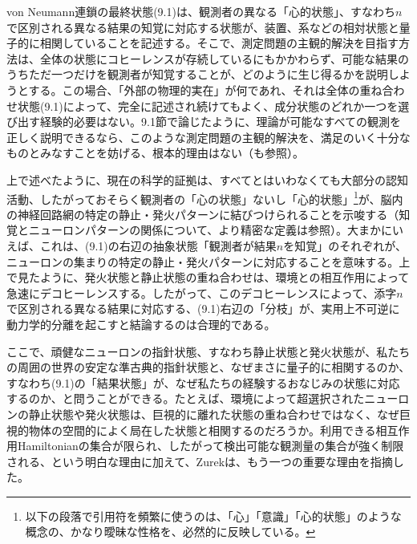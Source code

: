 \hypertarget{srcpage:375}{}\label{srcpage:375}
von Neumann連鎖の最終状態(9.1)は、観測者の異なる「心的状態」、すなわち$n$で区別される異なる結果の知覚に対応する状態が、装置、系などの相対状態と量子的に相関していることを記述する。そこで、測定問題の主観的解決を目指す方法は、全体の状態にコヒーレンスが存続しているにもかかわらず、可能な結果のうちただ一つだけを観測者が知覚することが、どのように生じ得るかを説明しようとする。この場合、「外部の物理的実在」が何であれ、それは全体の重ね合わせ状態(9.1)によって、完全に記述され続けてもよく、成分状態のどれか一つを選び出す経験的必要はない。9.1節で論じたように、理論が可能なすべての観測を正しく説明できるなら、このような測定問題の主観的解決を、満足のいく十分なものとみなすことを妨げる、根本的理由はない（\cite{ref001,ref322,ref496}も参照）。

上で述べたように、現在の科学的証拠は、すべてとはいわなくても大部分の認知活動、したがっておそらく観測者の「心の状態」ないし「心的状態」\footnote{以下の段落で引用符を頻繁に使うのは、「心」「意識」「心的状態」のような概念の、かなり曖昧な性格を、必然的に反映している。}が、脳内の神経回路網の特定の静止・発火パターンに結びつけられることを示唆する（知覚とニューロンパターンの関係について、より精密な定義は\cite{ref504,ref522}参照）。大まかにいえば、これは、(9.1)の右辺の抽象状態「観測者が結果$n$を知覚」のそれぞれが、ニューロンの集まりの特定の静止・発火パターンに対応することを意味する。上で見たように、発火状態と静止状態の重ね合わせは、環境との相互作用によって急速にデコヒーレンスする。したがって、このデコヒーレンスによって、添字$n$で区別される異なる結果に対応する、(9.1)右辺の「分枝」が、実用上不可逆に動力学的分離を起こすと結論するのは合理的である。

ここで、頑健なニューロンの指針状態、すなわち静止状態と発火状態が、私たちの周囲の世界の安定な準古典的指針状態と、なぜまさに量子的に相関するのか、すなわち(9.1)の「結果状態」が、なぜ私たちの経験するおなじみの状態に対応するのか、と問うことができる。たとえば、環境によって超選択されたニューロンの静止状態や発火状態は、巨視的に離れた状態の重ね合わせではなく、なぜ巨視的物体の空間的によく局在した状態と相関するのだろうか。利用できる相互作用Hamiltonianの集合が限られ、したがって検出可能な観測量の集合が強く制限される、という明白な理由に加えて、Zurek\cite{ref013}は、もう一つの重要な理由を指摘した。

